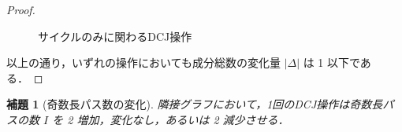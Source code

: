 \documentclass[paper=a4,fontsize=11pt,report,oneside]{jlreq}
\newtheorem{lemma}[theorem]{補題}
\begin{document}
\begin{proof}
\begin{enumerate}
\begin{figure}[H]
{
    }
    \caption{サイクルのみに関わるDCJ操作}
    \label{fig:dcj_cycles}
\end{figure}
\end{enumerate}

以上の通り，いずれの操作においても成分総数の変化量 $|\Delta|$ は 1 以下である．
\end{proof}

\begin{lemma}[奇数長パス数の変化]
\label{lem:odd_path_change}
隣接グラフにおいて，1回のDCJ操作は奇数長パスの数 $I$ を 2 増加，変化なし，あるいは 2 減少させる．
\end{lemma}
\end{document}
